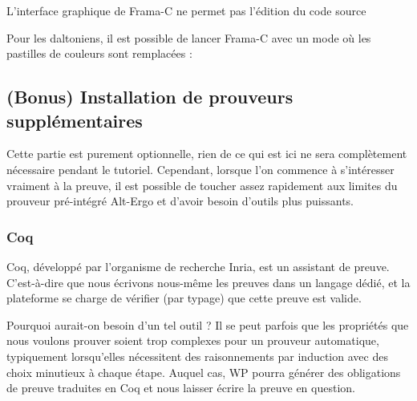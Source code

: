 \documentclass[12pt,francais,]{scrbook}
\newenvironment{Shaded}{}{}
\newcommand{\KeywordTok}[1]{\textcolor[rgb]{0.00,0.44,0.13}{\textbf{{#1}}}}
\newenvironment{zdsalertblock}[1]{%
  \tcolorbox[beamer,%
    noparskip,breakable,
    colback=LightCoral,colframe=DarkRed,%
    colbacklower=Tomato,%
    title=#1]
}{\endtcolorbox}
\newenvironment{zdsblock}[1]{%
  \tcolorbox[beamer,%
    noparskip,breakable,
    colback=LightBlue,colframe=DarkBlue,%
    colbacklower=DarkBlue,%
    title=#1]
}{\endtcolorbox}
\begin{document}
\begin{zdsalertblock}{Attention}
  L'interface graphique de Frama-C ne permet pas l'édition du code source
\end{zdsalertblock}

\begin{zdsblock}{Information}
  Pour les daltoniens, il est possible de lancer Frama-C avec un mode où
  les pastilles de couleurs sont remplacées :
  \begin{footnotesize}\begin{Shaded}
  \end{Shaded}\end{footnotesize}
\end{zdsblock}

\subsection{(Bonus) Installation de prouveurs
supplémentaires}\label{bonus-installation-de-prouveurs-suppluxe9mentaires}

Cette partie est purement optionnelle, rien de ce qui est ici ne sera
complètement nécessaire pendant le tutoriel. Cependant, lorsque l'on
commence à s'intéresser vraiment à la preuve, il est possible de toucher
assez rapidement aux limites du prouveur pré-intégré Alt-Ergo et d'avoir
besoin d'outils plus puissants.

\subsubsection{Coq}\label{coq}

Coq, développé par l'organisme de recherche Inria, est un assistant de
preuve. C'est-à-dire que nous écrivons nous-même les preuves dans un
langage dédié, et la plateforme se charge de vérifier (par typage) que
cette preuve est valide.

Pourquoi aurait-on besoin d'un tel outil ? Il se peut parfois que les
propriétés que nous voulons prouver soient trop complexes pour un
prouveur automatique, typiquement lorsqu'elles nécessitent des
raisonnements par induction avec des choix minutieux à chaque étape.
Auquel cas, WP pourra générer des obligations de preuve traduites en Coq
et nous laisser écrire la preuve en question.
\end{document}

